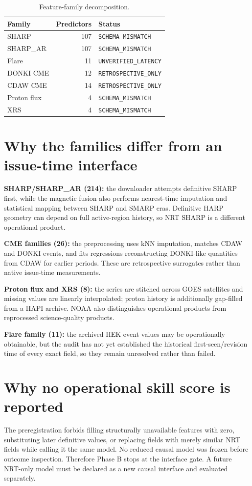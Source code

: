 \documentclass[11pt]{article}
\begin{document}
\begin{table}[h]\centering
\begin{tabular}{lrl}\toprule
Family & Predictors & Status \\\midrule
SHARP & 107 & \texttt{SCHEMA\_MISMATCH} \\
SHARP\_AR & 107 & \texttt{SCHEMA\_MISMATCH} \\
Flare & 11 & \texttt{UNVERIFIED\_LATENCY} \\
DONKI CME & 12 & \texttt{RETROSPECTIVE\_ONLY} \\
CDAW CME & 14 & \texttt{RETROSPECTIVE\_ONLY} \\
Proton flux & 4 & \texttt{SCHEMA\_MISMATCH} \\
XRS & 4 & \texttt{SCHEMA\_MISMATCH} \\\bottomrule
\end{tabular}\caption{Feature-family decomposition.}\end{table}

\section{Why the families differ from an issue-time interface}
\textbf{SHARP/SHARP\_AR (214):} the downloader attempts definitive SHARP first, while the magnetic fusion also performs nearest-time imputation and statistical mapping between SHARP and SMARP eras. Definitive HARP geometry can depend on full active-region history, so NRT SHARP is a different operational product.

\textbf{CME families (26):} the preprocessing uses kNN imputation, matches CDAW and DONKI events, and fits regressions reconstructing DONKI-like quantities from CDAW for earlier periods. These are retrospective surrogates rather than native issue-time measurements.

\textbf{Proton flux and XRS (8):} the series are stitched across GOES satellites and missing values are linearly interpolated; proton history is additionally gap-filled from a HAPI archive. NOAA also distinguishes operational products from reprocessed science-quality products.

\textbf{Flare family (11):} the archived HEK event values may be operationally obtainable, but the audit has not yet established the historical first-seen/revision time of every exact field, so they remain unresolved rather than failed.

\section{Why no operational skill score is reported}
The preregistration forbids filling structurally unavailable features with zero, substituting later definitive values, or replacing fields with merely similar NRT fields while calling it the same model. No reduced causal model was frozen before outcome inspection. Therefore Phase B stops at the interface gate. A future NRT-only model must be declared as a new causal interface and evaluated separately.
\end{document}
